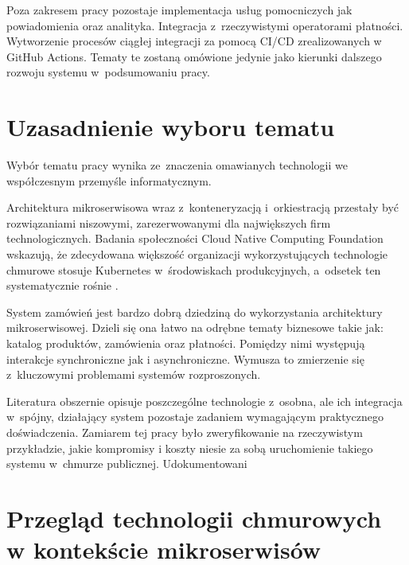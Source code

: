 Poza zakresem pracy pozostaje implementacja usług pomocniczych jak powiadomienia oraz analityka. Integracja z~rzeczywistymi
operatorami płatności. Wytworzenie procesów ciągłej integracji za pomocą CI/CD zrealizowanych w GitHub Actions.
Tematy te zostaną omówione jedynie jako kierunki dalszego rozwoju systemu w~podsumowaniu pracy. 

\section*{Uzasadnienie wyboru tematu}
{}
\label{sec:uzasadnienie-wyboru-tematu}

Wybór tematu pracy wynika ze~znaczenia omawianych technologii we współczesnym przemyśle informatycznym.

Architektura mikroserwisowa wraz z~konteneryzacją i~orkiestracją przestały być rozwiązaniami niszowymi, 
zarezerwowanymi dla największych firm technologicznych. Badania społeczności Cloud Native Computing Foundation wskazują, 
że zdecydowana większość organizacji wykorzystujących technologie chmurowe stosuje Kubernetes w~środowiskach produkcyjnych, 
a~odsetek ten systematycznie rośnie \parencite{cncf2023}. 

System zamówień jest bardzo dobrą dziedziną do wykorzystania architektury mikroserwisowej. Dzieli się ona łatwo na odrębne
tematy biznesowe takie jak: katalog produktów, zamówienia oraz płatności. Pomiędzy nimi występują interakcje synchroniczne
jak i asynchroniczne. Wymusza to zmierzenie się z~kluczowymi problemami systemów rozproszonych.

Literatura obszernie opisuje poszczególne technologie z~osobna, ale ich integracja w~spójny, działający system pozostaje
zadaniem wymagającym praktycznego doświadczenia. Zamiarem tej pracy było zweryfikowanie na rzeczywistym przykładzie, jakie kompromisy
i koszty niesie za sobą uruchomienie takiego systemu w~chmurze publicznej. Udokumentowani

\section*{Przegląd technologii chmurowych w kontekście mikroserwisów}
{}
\label{sec:przeglad-technologii-chmurowych}

